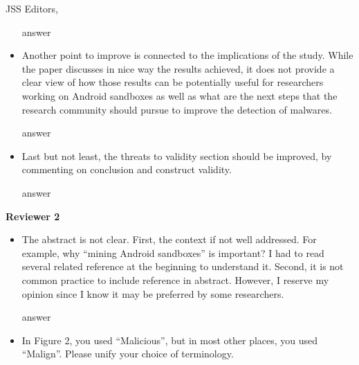 \documentclass{letter}
\begin{document}
\begin{letter}{JSS Editors,}
\begin{itemize}
\vspace{0.2cm}

{\color{blue}{\bf Answer:} answer}

\vspace{0.2cm}

\item Another point to improve is connected to the implications of the study. While the paper discusses in nice way the 
results achieved, it does not provide a clear view of how those results can be potentially useful for researchers 
working on Android sandboxes as well as what are the next steps that the research community should pursue to 
improve the detection of malwares.


\vspace{0.2cm}

{\color{blue}{\bf Answer:} answer}

\vspace{0.2cm}

\item Last but not least, the threats to validity section should be improved, by commenting on conclusion and construct validity.


\vspace{0.2cm}

{\color{blue}{\bf Answer:} answer}


\end{itemize}

{\bf Reviewer 2}

\begin{itemize}

\item The abstract is not clear. First, the context if not well addressed. For example, why ``mining Android sandboxes'' is 
important? I had to read several related reference at the beginning to understand it. Second, it is not common practice to 
include reference in abstract. However, I reserve my opinion since I know it may be preferred by some researchers.


\vspace{0.2cm}

{\color{blue}{\bf Answer:} answer}

\vspace{0.2cm}

\item In Figure 2, you used ``Malicious'', but in most other places, you used ``Malign''. Please unify your choice of terminology.


\vspace{0.2cm}


\end{itemize}
\end{letter}
\end{document}
